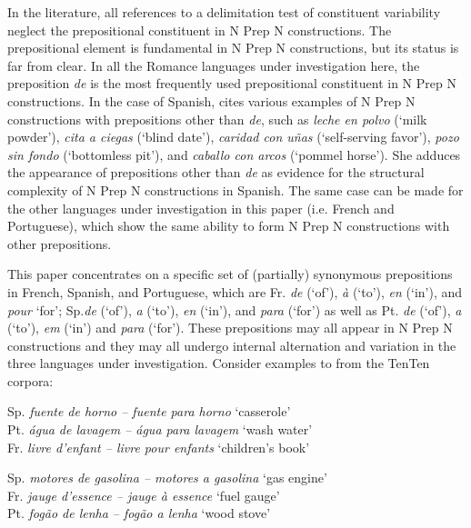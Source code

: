 \documentclass[output=paper]{langsci/langscibook}
\begin{document}
In the literature, all references to a delimitation test of constituent variability neglect the prepositional constituent in N Prep N constructions. The prepositional element is fundamental in N Prep N constructions, but its status is far from clear. In all the Romance languages under investigation here, the preposition \textit{de} is the most frequently used prepositional constituent in N Prep N constructions. In the case of Spanish, \citet{BuenafuentesdelaMata:2010} cites various examples of N Prep N constructions with prepositions other than \textit{de}, such as \textit{leche en polvo} (`milk powder'), \textit{cita a ciegas} (`blind date'), \textit{caridad con uñas} (`self-serving favor'), \textit{pozo sin fondo} (`bottomless pit'), and \textit{caballo con arcos} (`pommel horse'). She adduces the appearance of prepositions other than \textit{de} as evidence for the structural complexity of N Prep N constructions in Spanish. The same case can be made for the other languages under investigation in this paper (i.e. French and Portuguese), which show the same ability to form N Prep N constructions with other prepositions.
 
 This paper concentrates on a specific set of (partially) synonymous prepositions in French, Spanish, and Portuguese, which are Fr. \textit{de} (`of'), \textit{à} (`to'), \textit{en} (`in'), and \textit{pour} `for'; Sp.\textit{de} (`of'), \textit{a} (`to'), \textit {en} (`in'), and \textit{para} (`for') as well as Pt. \textit{de} (`of'), \textit{a} (`to'), \textit{em} (`in') and \textit{para} (`for'). These prepositions may all appear in N Prep N constructions and they may all undergo internal alternation and variation in the three languages under investigation. Consider examples  to  from the TenTen corpora:
 
\ea \label{ex:hennecke:1}
  \ea\label{ex:hennecke:1a} Sp. \textit{fuente de horno – fuente para horno}   `casserole' \\ 
  \ex\label{ex:hennecke:1b} Pt. \textit{água de lavagem – água para lavagem}     `wash water' \\ 
  \ex\label{ex:hennecke:1c} Fr. \textit{livre d'enfant – livre pour enfants}    `children’s book' \\ 
 \z
\z

\ea \label{ex:hennecke:2}
  \ea\label{ex:hennecke:2a} Sp. \textit{motores de gasolina – motores a gasolina}    `gas engine' \\ 
  \ex\label{ex:hennecke:2b} Fr. \textit{jauge d'essence – jauge à essence}   `fuel gauge' \\ 
  \ex\label{ex:hennecke:2c} Pt. \textit{fogão de lenha – fogão a lenha}   `wood stove' \\ 
 \z
\z
\end{document}
